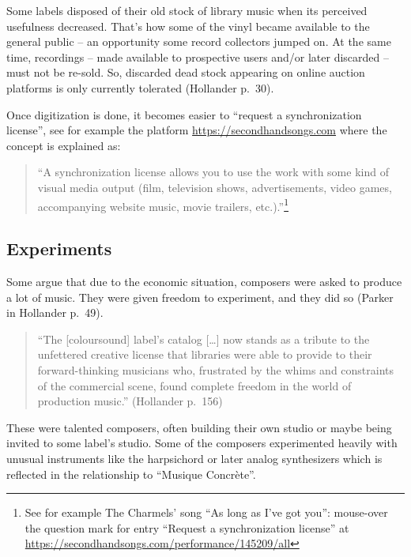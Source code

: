 \documentclass[a4paper,
fontsize=11pt,
oneside,
numbers=noperiodatend,
parskip=half-,
bibliography=totoc,
final
]{scrartcl}
\begin{document}
Some labels disposed of their old stock of library music when its
perceived usefulness decreased. That's how some of the vinyl became
available to the general public -- an opportunity some record collectors
jumped on. At the same time, recordings -- made available to prospective
users and/or later discarded -- must not be re-sold. So, discarded dead
stock appearing on online auction platforms is only currently tolerated
(Hollander p.~30).

Once digitization is done, it becomes easier to \enquote{request a
synchronization license}, see for example the platform
\url{https://secondhandsongs.com} where the concept is explained as:

\begin{quote}
\enquote{A synchronization license allows you to use the work with some
kind of visual media output (film, television shows, advertisements,
video games, accompanying website music, movie trailers,
etc.).}\footnote{See for example The Charmels' song \enquote{As long as
  I've got you}: mouse-over the question mark for entry \enquote{Request
  a synchronization license} at
  \url{https://secondhandsongs.com/performance/145209/all}}
\end{quote}

\hypertarget{experiments}{%
\subsection{Experiments}\label{experiments}}

Some argue that due to the economic situation, composers were asked to
produce a lot of music. They were given freedom to experiment, and they
did so (Parker in Hollander p.~49).

\begin{quote}
\enquote{The {[}coloursound{]} label's catalog {[}\ldots{]} now stands
as a tribute to the unfettered creative license that libraries were able
to provide to their forward-thinking musicians who, frustrated by the
whims and constraints of the commercial scene, found complete freedom in
the world of production music.} (Hollander p.~156)
\end{quote}

These were talented composers, often building their own studio or maybe
being invited to some label's studio. Some of the composers experimented
heavily with unusual instruments like the harpsichord or later analog
synthesizers which is reflected in the relationship to \enquote{Musique
Concrète}.
\end{document}
